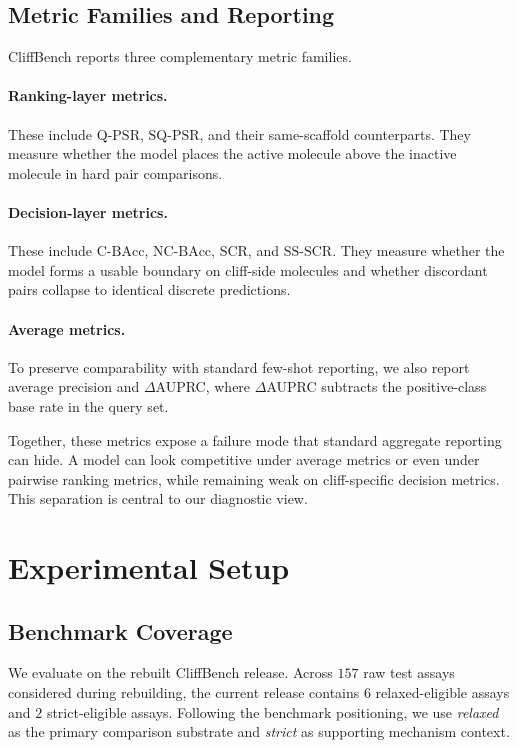\documentclass{article}
\begin{document}
\subsection{Metric Families and Reporting}

CliffBench reports three complementary metric families.

\paragraph{Ranking-layer metrics.}
These include $\mathrm{Q\mbox{-}PSR}$, $\mathrm{SQ\mbox{-}PSR}$, and their same-scaffold counterparts. They
measure whether the model places the active molecule above the inactive molecule in hard pair comparisons.

\paragraph{Decision-layer metrics.}
These include $\mathrm{C\mbox{-}BAcc}$, $\mathrm{NC\mbox{-}BAcc}$, $\mathrm{SCR}$, and $\mathrm{SS\mbox{-}SCR}$.
They measure whether the model forms a usable boundary on cliff-side molecules and whether discordant pairs
collapse to identical discrete predictions.

\paragraph{Average metrics.}
To preserve comparability with standard few-shot reporting, we also report average precision and $\Delta$AUPRC,
where $\Delta$AUPRC subtracts the positive-class base rate in the query set.

Together, these metrics expose a failure mode that standard aggregate reporting can hide. A model can look
competitive under average metrics or even under pairwise ranking metrics, while remaining weak on cliff-specific
decision metrics. This separation is central to our diagnostic view.

\section{Experimental Setup}

\subsection{Benchmark Coverage}

We evaluate on the rebuilt CliffBench release. Across $157$ raw test assays considered during rebuilding, the
current release contains $6$ relaxed-eligible assays and $2$ strict-eligible assays.
Following the benchmark positioning, we use \emph{relaxed} as the primary comparison substrate and \emph{strict}
as supporting mechanism context.
\end{document}
